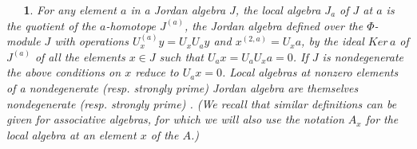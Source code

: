 \documentclass[a4paper,twoside,11pt]{article}
\theoremstyle{plain}
\theoremstyle{miestilo}
\newtheorem{lema}[subsection]{Lemma.}
\theoremstyle{misnotas}
\newtheorem{apartado}[subsection]{\ {\ }}
\begin{document}
\begin{apartado}\label{local algebras} For any element  $a$ in a Jordan algebra $J$,  the   \emph{local algebra  $J_a$
of $J$ at $a$} is the  quotient of the $a$-homotope $J^{(a)}$, the Jordan algebra defined over the $\Phi$-module $J$ with operations $U^{(a)}_xy = U_xU_ay$ and  $x^{(2,a)}= U_xa$, by the
ideal $Ker\,  a$ of $J^{(a)}$ of all the elements $x\in J$ such that
$U_ax=U_aU_xa=0$. If $J$ is nondegenerate  the above conditions on $x$
reduce  to $U_ax=0$.
Local algebras at nonzero elements of a nondegenerate (resp. strongly prime) Jordan algebra are themselves nondegenerate (resp. strongly prime) \cite[3.1.5]{jac-struc}. (We recall that similar definitions can be given for associative algebras, for which we will also use the notation $A
_x$ for the local algebra at an element $x$ of the $A$.)
\end{apartado}



\end{document}

